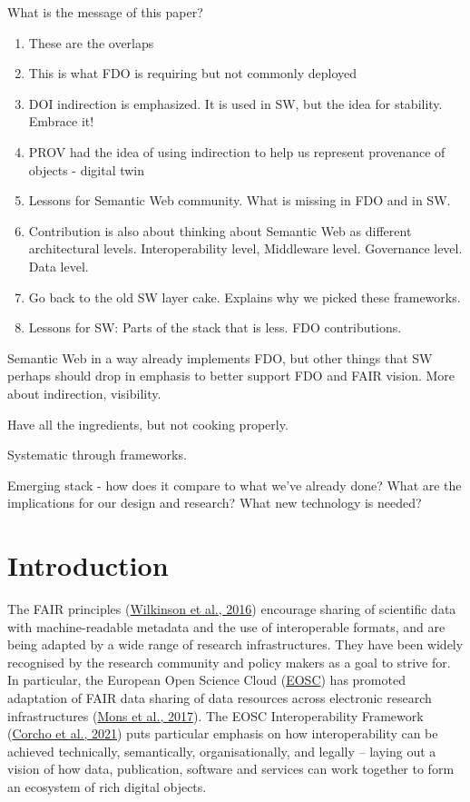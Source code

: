 What is the message of this paper?

\begin{enumerate}
\def\labelenumi{\arabic{enumi}.}
\tightlist
\item
  These are the overlaps
\item
  This is what FDO is requiring but not commonly deployed
\item
  DOI indirection is emphasized. It is used in SW, but the idea for stability. Embrace it!
\item
  PROV had the idea of using indirection to help us represent provenance of objects - digital twin
\item
  Lessons for Semantic Web community. What is missing in FDO and in SW.
\item
  Contribution is also about thinking about Semantic Web as different architectural levels. Interoperability level, Middleware level. Governance level. Data level.
\item
  Go back to the old SW layer cake. Explains why we picked these frameworks.
\item
  Lessons for SW: Parts of the stack that is less. FDO contributions.
\end{enumerate}

Semantic Web in a way already implements FDO, but other things that SW perhaps should drop in emphasis to better support FDO and FAIR vision. More about indirection, visibility.

Have all the ingredients, but not cooking properly.

Systematic through frameworks.

Emerging stack - how does it compare to what we've already done? What are the implications for our design and research? What new technology is needed?

\hypertarget{sec:introduction}{%
\section{Introduction}\label{sec:introduction}}

The FAIR principles (\protect\hyperlink{ref-6DjakjNS}{Wilkinson et al., 2016}) encourage sharing of scientific data with machine-readable metadata and the use of interoperable formats, and are being adapted by a wide range of research infrastructures. They have been widely recognised by the research community and policy makers as a goal to strive for. In particular, the European Open Science Cloud (\href{https://www.eosc.eu/}{EOSC}) has promoted adaptation of FAIR data sharing of data resources across electronic research infrastructures (\protect\hyperlink{ref-u8Cy0psL}{Mons et al., 2017}). The EOSC Interoperability Framework (\protect\hyperlink{ref-aCye3KpE}{Corcho et al., 2021}) puts particular emphasis on how interoperability can be achieved technically, semantically, organisationally, and legally -- laying out a vision of how data, publication, software and services can work together to form an ecosystem of rich digital objects.

